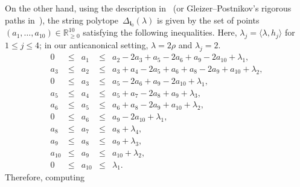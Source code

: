 \documentclass[10pt]{amsart}
\numberwithin{equation}{section}
\theoremstyle{plain}
\theoremstyle{definition}
\theoremstyle{remark}
\begin{document}
On the other hand,  using the description in~\cite[Section~5]{Littelmann98} (or  Gleizer--Postnikov's rigorous paths in~\cite{GP00}), the string polytope~$\Delta_{{\bm i}_0}(\lambda)$ is given by the set of points $(a_1,\dots,a_{10}) \in \mathbb{R}^{10}_{\geq 0}$ satisfying the following inequalities. Here, $\lambda_j=\langle\lambda,h_j\rangle$ for $1\leq j\leq4$;
in our anticanonical setting, $\lambda=2\rho$ and $\lambda_j=2$. 
\[
\begin{array}{rcccl}
	0 & \leq & a_1 & \leq & a_2 - 2a_3 + a_5 -2a_6 + a_9 - 2a_{10} + \lambda_1, \\
	a_3 & \leq & a_2 & \leq & a_3 + a_4 - 2a_5 + a_6 + a_8 -2a_9 +a_{10} + \lambda_2, \\
	0 & \leq & a_3 & \leq & a_5 - 2a_6 + a_9 -2a_{10} + \lambda_1, \\
	a_5 & \leq & a_4 & \leq & a_5 + a_7 - 2a_8 + a_9 + \lambda_3, \\
	a_6 &\leq& a_5 &\leq& a_6+a_8-2a_9+a_{10}+\lambda_2, \\
0 &\leq& a_6 &\leq& a_9-2a_{10}+\lambda_1,\\
	a_8 & \leq & a_7 & \leq & a_8 + \lambda_4, \\
	a_9 & \leq & a_8 & \leq & a_9 + \lambda_3, \\
	a_{10} & \leq & a_9 & \leq & a_{10} + \lambda_2, \\
	0 & \leq & a_{10} & \leq & \lambda_1.
\end{array}
\]
Therefore, computing
\end{document}
